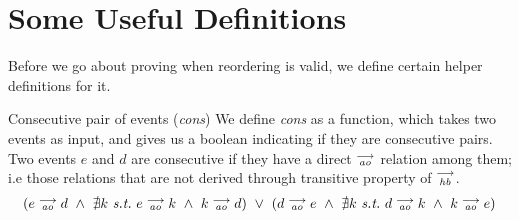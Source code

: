 \section{Some Useful Definitions}
Before we go about proving when reordering is valid, we define certain helper definitions for it\footnotemark.


\begin{definition}{Consecutive pair of events (\emph{cons})}
    \label{Cons}
    We define \emph{cons} as a function, which takes two events as input, and gives us a boolean indicating if they are consecutive pairs. Two events $e$ and $d$ are consecutive if they have a direct $\stackrel{\longrightarrow}{_\textit{ao}}$ relation among them;  i.e those relations that are not derived through transitive property of $\stackrel{\longrightarrow}{_\textit{hb}}$. 
    \begin{align*}
        (
        e \stck{_\textit{ao}} d  \ \wedge \ 
        \nexists k \ \textit{s.t.} \ 
        e \stck{_\textit{ao}} k  \ \wedge \
        k \stck{_\textit{ao}} d 
        )
        \ \vee \
        (
            d \stck{_\textit{ao}} e  \ \wedge \ 
            \nexists k \ \textit{s.t.} \ 
            d \stck{_\textit{ao}} k  \ \wedge \
            k \stck{_\textit{ao}} e  
        )
    \end{align*}
\end{definition}

